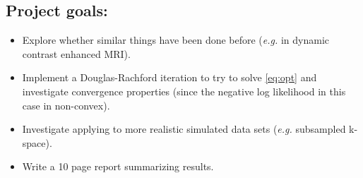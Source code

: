 \documentclass{article}
\newcommand{\argmin}{\operatorname*{argmin}}
\newcommand{\prox}{\operatorname{prox}}
\begin{document}
%

\subsection{Project goals:}
\begin{itemize}
\item Explore whether similar things have been done before (\emph{e.g.} in dynamic contrast enhanced MRI). 
\item Implement a Douglas-Rachford iteration to try to solve \eqref{eq:opt} and investigate convergence properties (since the negative log likelihood in this case in non-convex). 
\item Investigate applying to more realistic simulated data sets (\emph{e.g.} subsampled k-space). 
\item Write a 10 page report summarizing results. 
\end{itemize} 



\end{document}
